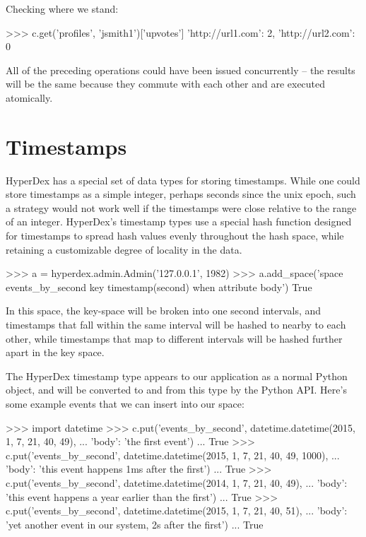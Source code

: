 Checking where we stand:

\begin{pythoncode}
>>> c.get('profiles', 'jsmith1')['upvotes']
{'http://url1.com': 2, 'http://url2.com': 0}
\end{pythoncode}

All of the preceding operations could have been issued concurrently -- the
results will be the same because they commute with each other and are executed
atomically.

\section{Timestamps}

HyperDex has a special set of data types for storing timestamps.  While one
could store timestamps as a simple integer, perhaps seconds since the unix
epoch, such a strategy would not work well if the timestamps were close relative
to the range of an integer.  HyperDex's timestamp types use a special hash
function designed for timestamps to spread hash values evenly throughout the
hash space, while retaining a customizable degree of locality in the data.

\begin{pythoncode}
>>> a = hyperdex.admin.Admin('127.0.0.1', 1982)
>>> a.add_space('space events_by_second key timestamp(second) when attribute body')
True
\end{pythoncode}

In this space, the key-space will be broken into one second intervals, and
timestamps that fall within the same interval will be hashed to nearby to each
other, while timestamps that map to different intervals will be hashed further
apart in the key space.

The HyperDex timestamp type appears to our application as a normal Python
 object, and will be converted to and from this type by
the Python API.  Here's some example events that we can insert into our space:

\begin{pythoncode}
>>> import datetime
>>> c.put('events_by_second', datetime.datetime(2015, 1, 7, 21, 40, 49),
...       {'body': 'the first event'})
...
True
>>> c.put('events_by_second', datetime.datetime(2015, 1, 7, 21, 40, 49, 1000),
...       {'body': 'this event happens 1ms after the first'})
...
True
>>> c.put('events_by_second', datetime.datetime(2014, 1, 7, 21, 40, 49),
...       {'body': 'this event happens a year earlier than the first'})
...
True
>>> c.put('events_by_second', datetime.datetime(2015, 1, 7, 21, 40, 51),
...       {'body': 'yet another event in our system, 2s after the first'})
...
True
\end{pythoncode}

